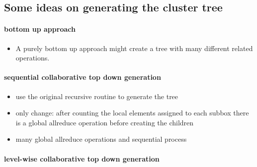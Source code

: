 \documentclass[a4paper,11pt]{article}
\theoremstyle{plain}
\theoremstyle{definition}
\theoremstyle{remark}
\begin{document}
\subsection{Some ideas on generating the cluster tree}

\paragraph{bottom up approach}
\begin{itemize}
\item A purely bottom up approach might create a tree with many different
  related operations.
\end{itemize}

\paragraph{sequential collaborative top down generation}
\begin{itemize}
\item use the original recursive routine to generate the tree
\item only change: after counting the local elements assigned to each subbox
  there is a global allreduce operation before creating the children
\item many global allreduce operations and sequential process
\end{itemize}

\paragraph{level-wise collaborative top down generation}
\end{document}
